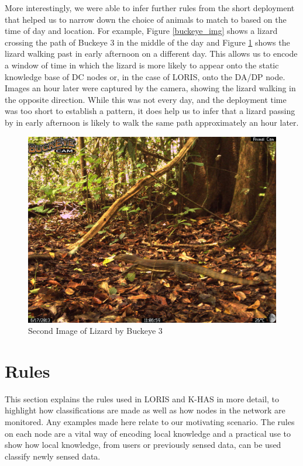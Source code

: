 		More interestingly, we were able to infer further rules from the short deployment that helped us to narrow down the choice of animals to match to based on the time of day and location. For example, Figure \ref{buckeye_img} shows a lizard crossing the path of Buckeye 3 in the middle of the day and Figure \ref{buckeye_img_2} shows the lizard walking past in early afternoon on a different day. This allows us to encode a window of time  in which the lizard is more likely to appear onto the static knowledge base of DC nodes or, in the case of LORIS, onto the DA/DP node. Images an hour later were captured by the camera, showing the lizard walking in the opposite direction. While this was not every day, and the deployment time was too short to establish a pattern, it does help us to infer that a lizard passing by in early afternoon is likely to walk the same path approximately an hour later.
		
		    \begin{figure}[h]
		    \centering
			\includegraphics[width=\textwidth]{Chap6/figures/buckeye_img_2}
		    \caption{Second Image of Lizard by Buckeye 3}
		    \label{buckeye_img_2}
		    \end{figure}
	
	\section{Rules}
		This section explains the rules used in LORIS and K-HAS in more detail, to highlight how classifications are made as well as how nodes in the network are monitored. Any examples made here relate to our motivating scenario. The rules on each node are a vital way of encoding local knowledge and a practical use to show how local knowledge, from users or previously sensed data, can be used classify newly sensed data.
		
